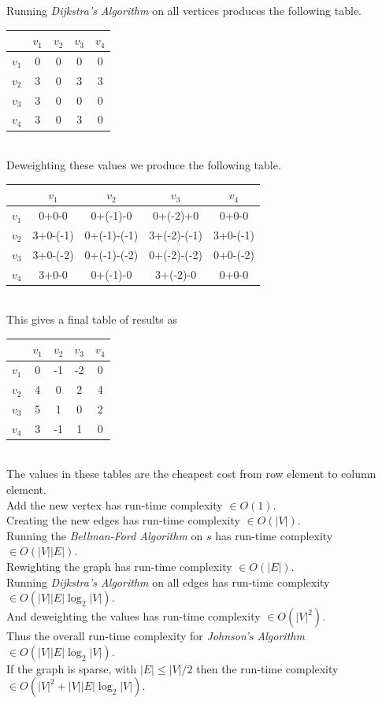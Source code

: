 \documentclass[11pt,a4paper]{article}
\begin{document}
Running \textit{Dijkstra's Algorithm} on all vertices produces the following table.\\
\begin{tabular}{|c|c|c|c|c|}
\hline
&$v_1$&$v_2$&$v_3$&$v_4$\\
\hline
$v_1$&0&0&0&0\\
\hline
$v_2$&3&0&3&3\\
\hline
$v_3$&3&0&0&0\\
\hline
$v_4$&3&0&3&0\\
\hline
\end{tabular}\\
Deweighting these values we produce the following table.\\
\begin{tabular}{|c|c|c|c|c|}
\hline
&$v_1$&$v_2$&$v_3$&$v_4$\\
\hline
$v_1$&0+0-0&0+(-1)-0&0+(-2)+0&0+0-0\\
\hline
$v_2$&3+0-(-1)&0+(-1)-(-1)&3+(-2)-(-1)&3+0-(-1)\\
\hline
$v_3$&3+0-(-2)&0+(-1)-(-2)&0+(-2)-(-2)&0+0-(-2)\\
\hline
$v_4$&3+0-0&0+(-1)-0&3+(-2)-0&0+0-0\\
\hline
\end{tabular}\\
This gives a final table of results as\\
\begin{tabular}{|c|c|c|c|c|}
\hline
&$v_1$&$v_2$&$v_3$&$v_4$\\
\hline
$v_1$&0&-1&-2&0\\
\hline
$v_2$&4&0&2&4\\
\hline
$v_3$&5&1&0&2\\
\hline
$v_4$&3&-1&1&0\\
\hline
\end{tabular}\\
\nb The values in these tables are the cheapest cost from row element to column element.\\

Add the new vertex has run-time complexity $\in O(1)$.\\
Creating the new edges has run-time complexity $\in O(|V|)$.\\
Running the \textit{Bellman-Ford Algorithm} on $s$ has run-time complexity $\in O(|V||E|)$.\\
Rewighting the graph has run-time complexity $\in O(|E|)$.\\
Running \textit{Dijkstra's Algorithm} on all edges has run-time complexity $\in O(|V||E|\log_2|V|)$.\\
And deweighting the values has run-time complexity $\in O(|V|^2)$.\\
Thus the overall run-time complexity for \textit{Johnson's Algorithm} $\in O(|V||E|\log_2|V|)$.\\
\nb If the graph is sparse, with $|E|\leq |V|/2$ then the run-time complexity $\in O(|V|^2+|V||E|\log_2|V|)$.\\
\end{document}
